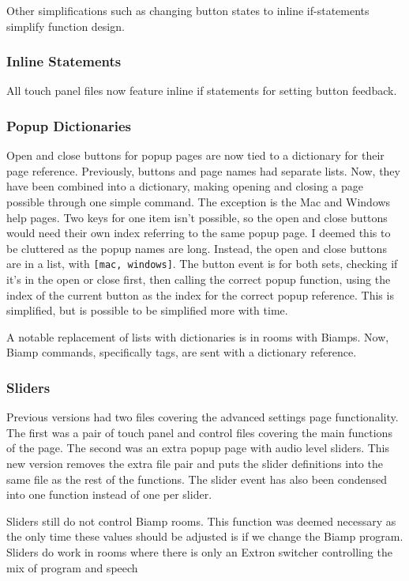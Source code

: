 \documentclass{article}
\begin{document}
Other simplifications such as changing button states to inline if-statements simplify function design. 

\subsubsection*{Inline Statements}

All touch panel files now feature inline if statements for setting button feedback. 

\subsubsection*{Popup Dictionaries}

Open and close buttons for popup pages are now tied to a dictionary for their page reference. Previously, buttons and page 
names had separate lists. Now, they have been combined into a dictionary, making opening and closing a page possible through 
one simple command. The exception is the Mac and Windows help pages. Two keys for one item isn't possible, so the open and 
close buttons would need their own index referring to the same popup page. I deemed this to be cluttered as the popup names 
are long. Instead, the open and close buttons are in a list, with \lstinline|[mac, windows]|. The button event is for both
sets, checking if it's in the open or close first, then calling the correct popup function, using the index of the current 
button as the index for the correct popup reference. This is simplified, but is possible to be simplified more with time. 

A notable replacement of lists with dictionaries is in rooms with Biamps. Now, Biamp commands, specifically tags, are sent 
with a dictionary reference. 

\subsubsection*{Sliders}

Previous versions had two files covering the advanced settings page functionality. The first was a pair of touch panel 
and control files covering the main functions of the page. The second was an extra popup page with audio level sliders.
This new version removes the extra file pair and puts the slider definitions into the same file as the rest of the
functions. The slider event has also been condensed into one function instead of one per slider. 

Sliders still do not control Biamp rooms. This function was deemed necessary as the only time these values should be adjusted 
is if we change the Biamp program. Sliders do work in rooms where there is only an Extron switcher controlling the mix of 
program and speech
\end{document}

